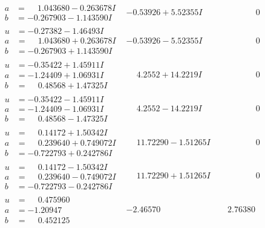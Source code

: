\documentclass[1p]{elsarticle_modified}
\theoremstyle{definition}
\begin{document}
$$\begin{array}{c|c|c}
\begin{aligned}
a &= \phantom{-}1.043680 - 0.263678 I \\
b &= -0.267903 - 1.143590 I\end{aligned}
 & -0.53926 + 5.52355 I & \phantom{-0.000000 } 0 \\ \hline\begin{aligned}
u &= -0.27382 - 1.46493 I \\
a &= \phantom{-}1.043680 + 0.263678 I \\
b &= -0.267903 + 1.143590 I\end{aligned}
 & -0.53926 - 5.52355 I & \phantom{-0.000000 } 0 \\ \hline\begin{aligned}
u &= -0.35422 + 1.45911 I \\
a &= -1.24409 + 1.06931 I \\
b &= \phantom{-}0.48568 + 1.47325 I\end{aligned}
 & \phantom{-}4.2552 + 14.2219 I & \phantom{-0.000000 } 0 \\ \hline\begin{aligned}
u &= -0.35422 - 1.45911 I \\
a &= -1.24409 - 1.06931 I \\
b &= \phantom{-}0.48568 - 1.47325 I\end{aligned}
 & \phantom{-}4.2552 - 14.2219 I & \phantom{-0.000000 } 0 \\ \hline\begin{aligned}
u &= \phantom{-}0.14172 + 1.50342 I \\
a &= \phantom{-}0.239640 + 0.749072 I \\
b &= -0.722793 + 0.242786 I\end{aligned}
 & \phantom{-}11.72290 - 1.51265 I & \phantom{-0.000000 } 0 \\ \hline\begin{aligned}
u &= \phantom{-}0.14172 - 1.50342 I \\
a &= \phantom{-}0.239640 - 0.749072 I \\
b &= -0.722793 - 0.242786 I\end{aligned}
 & \phantom{-}11.72290 + 1.51265 I & \phantom{-0.000000 } 0 \\ \hline\begin{aligned}
u &= \phantom{-}0.475960\phantom{ +0.000000I} \\
a &= -1.20947\phantom{ +0.000000I} \\
b &= \phantom{-}0.452125\phantom{ +0.000000I}\end{aligned}
 & -2.46570\phantom{ +0.000000I} & \phantom{-}2.76380\phantom{ +0.000000I}\\

\end{array}$$
\end{document}
